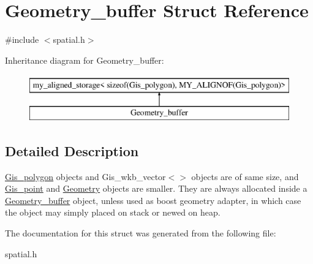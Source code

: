 \hypertarget{structGeometry__buffer}{}\section{Geometry\+\_\+buffer Struct Reference}
\label{structGeometry__buffer}


{\ttfamily \#include $<$spatial.\+h$>$}

Inheritance diagram for Geometry\+\_\+buffer\+:\begin{figure}[H]
\begin{center}
\leavevmode
\includegraphics[height=2.000000cm]{structGeometry__buffer}
\end{center}
\end{figure}


\subsection{Detailed Description}
\mbox{\hyperlink{classGis__polygon}{Gis\+\_\+polygon}} objects and Gis\+\_\+wkb\+\_\+vector$<$$>$ objects are of same size, and \mbox{\hyperlink{classGis__point}{Gis\+\_\+point}} and \mbox{\hyperlink{classGeometry}{Geometry}} objects are smaller. They are always allocated inside a \mbox{\hyperlink{structGeometry__buffer}{Geometry\+\_\+buffer}} object, unless used as boost geometry adapter, in which case the object may simply placed on stack or new\textquotesingle{}ed on heap. 

The documentation for this struct was generated from the following file\+:\begin{DoxyCompactItemize}
\item 
spatial.\+h\end{DoxyCompactItemize}
